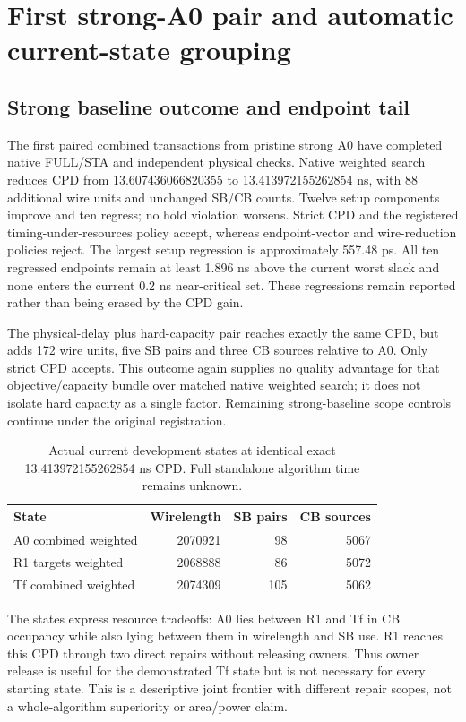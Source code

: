 
\section{First strong-A0 pair and automatic current-state grouping}
\subsection{Strong baseline outcome and endpoint tail}
The first paired combined transactions from pristine strong A0 have completed native FULL/STA and independent physical checks. Native weighted search reduces CPD from 13.607436066820355 to 13.413972155262854 ns, with 88 additional wire units and unchanged SB/CB counts. Twelve setup components improve and ten regress; no hold violation worsens. Strict CPD and the registered timing-under-resources policy accept, whereas endpoint-vector and wire-reduction policies reject. The largest setup regression is approximately 557.48 ps. All ten regressed endpoints remain at least 1.896 ns above the current worst slack and none enters the current 0.2 ns near-critical set. These regressions remain reported rather than being erased by the CPD gain.

The physical-delay plus hard-capacity pair reaches exactly the same CPD, but adds 172 wire units, five SB pairs and three CB sources relative to A0. Only strict CPD accepts. This outcome again supplies no quality advantage for that objective/capacity bundle over matched native weighted search; it does not isolate hard capacity as a single factor. Remaining strong-baseline scope controls continue under the original registration.

\begin{table}[t]
\centering\small
\caption{Actual current development states at identical exact 13.413972155262854 ns CPD. Full standalone algorithm time remains unknown.}
\begin{tabular}{lrrr}
\hline
State & Wirelength & SB pairs & CB sources\\
\hline
A0 combined weighted & 2070921 & 98 & 5067\\
R1 targets weighted & 2068888 & 86 & 5072\\
Tf combined weighted & 2074309 & 105 & 5062\\
\hline
\end{tabular}
\end{table}

The states express resource tradeoffs: A0 lies between R1 and Tf in CB occupancy while also lying between them in wirelength and SB use. R1 reaches this CPD through two direct repairs without releasing owners. Thus owner release is useful for the demonstrated Tf state but is not necessary for every starting state. This is a descriptive joint frontier with different repair scopes, not a whole-algorithm superiority or area/power claim.

